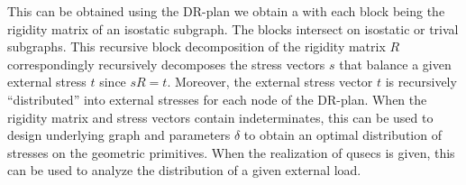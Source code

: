 This can be obtained using the DR-plan we obtain a
with each block being the
rigidity matrix of an isostatic subgraph. The blocks intersect on
isostatic or trival subgraphs. This recursive block decomposition of
the rigidity matrix $R$ correspondingly recursively decomposes
the stress vectors $s$ that balance a given external stress $t$ since
$sR = t$. Moreover, the external stress vector $t$ is
recursively ``distributed'' into external stresses for each
node of the DR-plan.
When the rigidity matrix and stress
vectors contain indeterminates, this  can be used to design
underlying graph and parameters $\delta$ to obtain an optimal
distribution of stresses on the geometric primitives. When the
realization of qusecs is given, this can be used to analyze the
distribution of a given external load.




